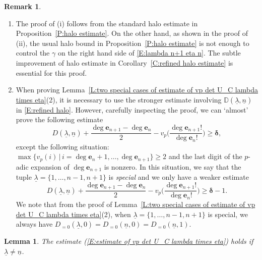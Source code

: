 \documentclass[12pt]{amsart}
\newtheorem{lemma}[subsection]{Lemma}
\theoremstyle{definition}
\newtheorem{remark}[subsection]{Remark}
\numberwithin{equation}{subsection}
\def\DD{\mathbb{D}}
\def\bfe{\mathbf{e}}
\begin{document}
\begin{remark}\label{R: remark after two special cases of estimate of vp det U_C lambda times eta}
\begin{enumerate}
\item The proof of (i) follows from the standard halo estimate in Proposition~\ref{P:halo estimate}. On the other hand, as shown in the proof of (ii), the usual halo bound in Proposition~\ref{P:halo estimate} is not enough to control the $\gamma$ on the right hand side of \eqref{E:lambda n+1 eta n}. The subtle improvement of halo estimate in Corollary~\ref{C:refined halo estimate} is essential for this proof.
\item When proving Lemma~\ref{L:two special cases of estimate of vp det U_C lambda times eta}(2), it is necessary to use the stronger estimate involving $\DD(\underline \lambda,\underline n)$ in \eqref{E:refined halo}. However, carefully inspecting the proof, we can `almost' prove the following estimate
\begin{equation}\label{E:`fake' estimate for lambda = 1,dots, n-1,n}
            D(\underline \lambda,\underline n)+\frac{\deg \bfe_{n+1} - \deg\bfe_n}2-v_p \Big( \frac{\deg \bfe_{n+1}!}{\deg \bfe_n !} \Big) \geq \boldsymbol{\delta} ,
        \end{equation}
except the following situation: 
$\max\{ v_p(i)\,|\, i=\deg \bfe_n+1,\dots, \deg \bfe_{n+1} \}\geq 2$ and the last digit of the $p$-adic expansion of $\deg\bfe_{n+1}$ is nonzero. In this situation, we say that the tuple $\underline \lambda=\{ 1,\dots, n-1,n+1\}$ is \emph{special} and we only have a weaker estimate
\begin{equation}\label{E:wekaer estimate for lambda = 1,dots, n-1,n}
D(\underline \lambda,\underline n)+\frac{\deg \bfe_{n+1} - \deg\bfe_n}2-v_p \Big( \frac{\deg \bfe_{n+1}!}{\deg \bfe_n !} \Big) \geq \boldsymbol{\delta} -1.
        \end{equation}
        We note that from the proof of Lemma~\ref{L:two special cases of estimate of vp det U_C lambda times eta}(2), when $\underline \lambda=\{ 1,\dots, n-1,n+1\}$ is special, we always have $D_{=0}(\underline \lambda,0)=D_{=0}(\underline n,0)=D_{=0}(\underline n,1)$.
        \end{enumerate}
\end{remark}


\begin{lemma}\label{L:estimate of vp det U_C lambda times eta holds if lambda neq n}
	The estimate (\ref{E:estimate of vp det U_C lambda times eta}) holds if $\underline \lambda\neq \underline n$.
\end{lemma}
\end{document}
